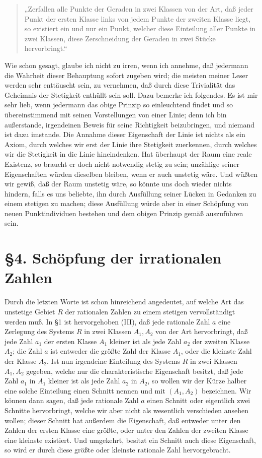 \documentclass[11pt]{article}
\begin{document}
\begin{quote}
„Zerfallen alle Punkte der Geraden in zwei Klassen von der Art, daß jeder Punkt der ersten Klasse links von jedem Punkte der zweiten Klasse liegt, so existiert ein und nur ein Punkt, welcher diese Einteilung aller Punkte in zwei Klassen, diese Zerschneidung der Geraden in zwei Stücke hervorbringt.“
\end{quote}

Wie schon gesagt, glaube ich nicht zu irren, wenn ich annehme, daß jedermann die Wahrheit dieser Behauptung sofort zugeben wird; die meisten meiner Leser werden sehr enttäuscht sein, zu vernehmen, daß durch diese Trivialität das Geheimnis der Stetigkeit enthüllt sein soll. Dazu bemerke ich folgendes. Es ist mir sehr lieb, wenn jedermann das obige Prinzip so einleuchtend findet und so übereinstimmend mit seinen Vorstellungen von einer Linie; denn ich bin außerstande, irgendeinen Beweis für seine Richtigkeit beizubringen, und niemand ist dazu imstande. Die Annahme dieser Eigenschaft der Linie ist nichts als ein Axiom, durch welches wir erst der Linie ihre Stetigkeit zuerkennen, durch welches wir die Stetigkeit in die Linie hineindenken. Hat überhaupt der Raum eine reale Existenz, so braucht er doch nicht notwendig stetig zu sein; unzählige seiner Eigenschaften würden dieselben bleiben, wenn er auch unstetig wäre. Und wüßten wir gewiß, daß der Raum unstetig wäre, so könnte uns doch wieder nichts hindern, falls es uns beliebte, ihn durch Ausfüllung seiner Lücken in Gedanken zu einem stetigen zu machen; diese Ausfüllung würde aber in einer Schöpfung von neuen Punktindividuen bestehen und dem obigen Prinzip gemäß auszuführen sein.

\section*{\S 4. Schöpfung der irrationalen Zahlen}

Durch die letzten Worte ist schon hinreichend angedeutet, auf welche Art das unstetige Gebiet $R$ der rationalen Zahlen zu einem stetigen vervollständigt werden muß. In \S 1 ist hervorgehoben (III), daß jede rationale Zahl $a$ eine Zerlegung des Systems $R$ in zwei Klassen $A_1,A_2$ von der Art hervorbringt, daß jede Zahl $a_1$ der ersten Klasse $A_1$ kleiner ist als jede Zahl $a_2$ der zweiten Klasse $A_2$; die Zahl $a$ ist entweder die größte Zahl der Klasse $A_1$, oder die kleinste Zahl der Klasse $A_2$. Ist nun irgendeine Einteilung des Systems $R$ in zwei Klassen $A_1,A_2$ gegeben, welche nur die charakteristische Eigenschaft besitzt, daß jede Zahl $a_1$ in $A_1$ kleiner ist als jede Zahl $a_2$ in $A_2$, so wollen wir der Kürze halber eine solche Einteilung einen Schnitt nennen und mit $(A_1,A_2)$ bezeichnen. Wir können dann sagen, daß jede rationale Zahl $a$ einen Schnitt oder eigentlich zwei Schnitte hervorbringt, welche wir aber nicht als wesentlich verschieden ansehen wollen; dieser Schnitt hat außerdem die Eigenschaft, daß entweder unter den Zahlen der ersten Klasse eine größte, oder unter den Zahlen der zweiten Klasse eine kleinste existiert. Und umgekehrt, besitzt ein Schnitt auch diese Eigenschaft, so wird er durch diese größte oder kleinste rationale Zahl hervorgebracht.
\end{document}
